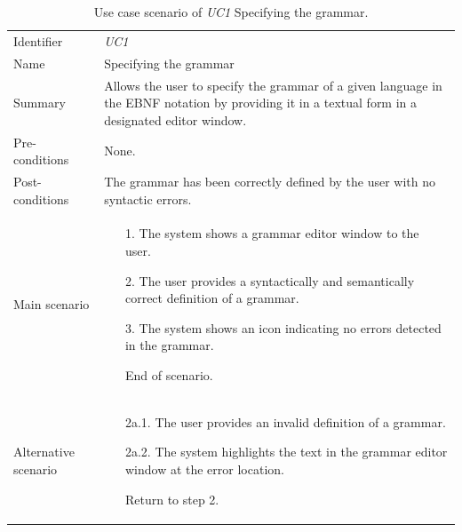 \documentclass[english,bachelors,forcepolishlogotype]{wizthesis}
\begin{document}
\begin{xltabular}{\textwidth}{@{}L{3cm}X@{}}
  \caption{Use case scenario of \emph{UC1} Specifying the grammar.}
  \label{tab:uc1-scenario}\\
  \toprule
  \endfirsthead
  \endhead
  \endfoot
  \endlastfoot
  Identifier & \emph{UC1} \\
  \addlinespace[0.5em] Name & Specifying the grammar \\
  \addlinespace[0.5em] Summary & Allows the user to specify the grammar of a
  given language in the EBNF notation by providing it in a textual form in a
  designated editor window. \\
  \addlinespace[0.5em] Pre-conditions & None. \\
  \addlinespace[0.5em] Post-conditions & The grammar has been correctly defined
  by the user with no syntactic errors. \\
  \addlinespace[0.5em] Main scenario &
  \begin{enumerate}[noitemsep,nolistsep,labelindent=0.5cm,align=right]
    \item [1.] The system shows a grammar editor window to the user.
    \item [2.] The user provides a syntactically and semantically correct
    definition of a grammar.
    \item [3.] The system shows an icon indicating no errors detected in the
    grammar.
    \item [] End of scenario.
  \end{enumerate} \\
  \addlinespace[0.5em] Alternative scenario &
  \begin{enumerate}[noitemsep,nolistsep,labelindent=0.5cm,align=right]
    \item [2a.1.] The user provides an invalid definition of a grammar.
    \item [2a.2.] The system highlights the text in the grammar editor window at
    the error location.
    \item [] Return to step 2.
  \end{enumerate} \\* \bottomrule
\end{xltabular}
\end{document}

